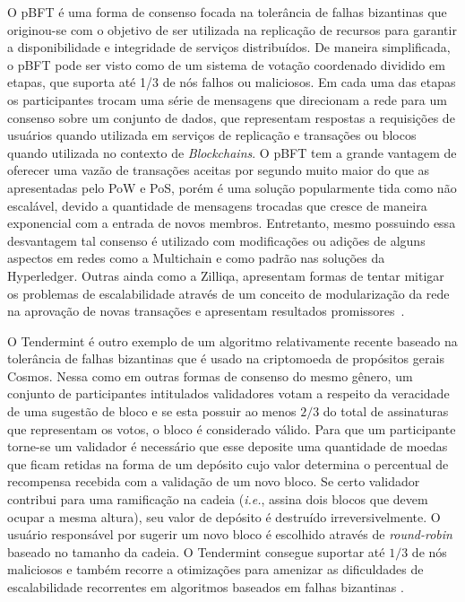 %
O \ac{pBFT} é uma forma de consenso focada na tolerância de falhas bizantinas que originou-se com o objetivo de ser utilizada na replicação de recursos para garantir a disponibilidade e integridade de serviços distribuídos. De maneira simplificada, o \ac{pBFT} pode ser visto como de um sistema de votação coordenado dividido em etapas, que suporta até 1/3 de nós falhos ou maliciosos. Em cada uma das etapas os participantes trocam uma série de mensagens que direcionam a rede para um consenso sobre um conjunto de dados, que representam respostas a requisições de usuários quando utilizada em serviços de replicação e transações ou blocos quando utilizada no contexto de \textit{Blockchains}\cite{blockchain:pbft}. O \ac{pBFT} tem a grande vantagem de oferecer uma vazão de transações aceitas por segundo muito maior do que as apresentadas pelo \ac{PoW} e \ac{PoS}, porém é uma solução popularmente tida como não escalável, devido a quantidade de mensagens trocadas que cresce de maneira exponencial com a entrada de novos membros. Entretanto, mesmo possuindo essa desvantagem tal consenso é utilizado com modificações ou adições de alguns aspectos em redes como a Multichain\cite{blockchain:multichain_whitepaper} e como padrão nas soluções da Hyperledger\cite{blockchain:hyperledger}. Outras ainda como a Zilliqa, apresentam formas de tentar mitigar os problemas de escalabilidade através de um conceito de modularização da rede na aprovação de novas transações e apresentam resultados promissores~\cite{blockchain:zilliqa_whitepaper}.

%
O Tendermint é outro exemplo de um algoritmo relativamente recente baseado na tolerância de falhas bizantinas que é usado na criptomoeda de propósitos gerais Cosmos. Nessa como em outras formas de consenso do mesmo gênero, um conjunto de participantes intitulados validadores votam a respeito da veracidade de uma sugestão de bloco e se esta possuir ao menos $2/3$ do total de assinaturas que representam os votos, o bloco é considerado válido. Para que um participante torne-se um validador é necessário que esse deposite uma quantidade de moedas que ficam retidas na forma de um depósito cujo valor determina o percentual de recompensa recebida com a validação de um novo bloco. Se certo validador contribui para uma ramificação na cadeia (\textit{i.e.}, assina dois blocos que devem ocupar a mesma altura), seu valor de depósito é destruído irreversivelmente. O usuário responsável por sugerir um novo bloco é escolhido através de \textit{round-robin} baseado no tamanho da cadeia. O Tendermint consegue suportar até $1/3$ de nós maliciosos e também recorre a otimizações para amenizar as dificuldades de escalabilidade recorrentes em algoritmos baseados em falhas bizantinas \cite{blockchain:tendermint}.

